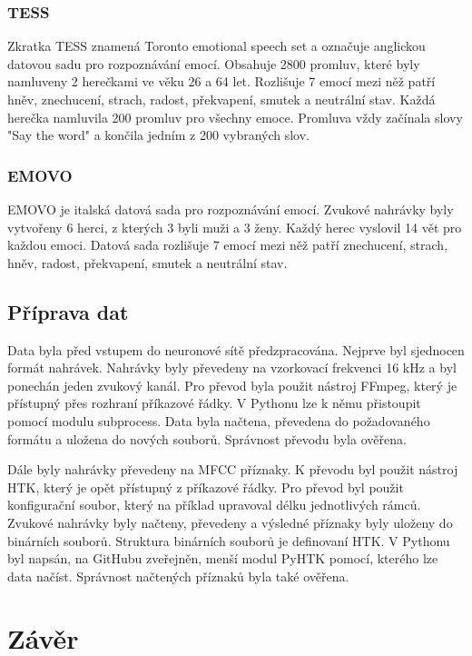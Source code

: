 \documentclass[FM,BP]{tulthesis}
\begin{document}
\subsection{TESS}
Zkratka TESS znamená Toronto emotional speech set a označuje anglickou datovou sadu pro rozpoznávání emocí. Obsahuje 2800 promluv, které byly namluveny 2 herečkami ve věku 26 a 64 let. Rozlišuje 7 emocí mezi něž patří hněv, znechucení, strach, radost, překvapení, smutek a neutrální stav. Každá herečka namluvila 200 promluv pro všechny emoce. Promluva vždy začínala slovy "Say the word" a končila jedním z 200 vybraných slov.\cite{tess}

\subsection{EMOVO}
EMOVO je italská datová sada pro rozpoznávání emocí. Zvukové nahrávky byly vytvořeny 6 herci, z kterých 3 byli muži a 3 ženy. Každý herec vyslovil 14 vět pro každou emoci. Datová sada rozlišuje 7 emocí mezi něž patří znechucení, strach, hněv, radost, překvapení, smutek a neutrální stav.\cite{COSTANTINI14.591}

\section{Příprava dat}
Data byla před vstupem do neuronové sítě předzpracována. Nejprve byl sjednocen formát nahrávek. Nahrávky byly převedeny na vzorkovací frekvenci 16 kHz a byl ponechán jeden zvukový kanál. Pro převod byla použit nástroj FFmpeg, který je přístupný přes rozhraní příkazové řádky. V Pythonu lze k němu přistoupit pomocí modulu subprocess. Data byla načtena, převedena do požadovaného formátu a uložena do nových souborů. Správnost převodu byla ověřena.

Dále byly nahrávky převedeny na MFCC příznaky. K převodu byl použit nástroj HTK, který je opět přístupný z příkazové řádky. Pro převod byl použit konfigurační soubor, který na příklad upravoval délku jednotlivých rámců. Zvukové nahrávky byly načteny, převedeny a výsledné příznaky byly uloženy do binárních souborů. Struktura binárních souborů je definovaní HTK. V Pythonu byl napsán, na GitHubu zveřejněn, menší modul PyHTK pomocí, kterého lze data načíst. Správnost načtených příznaků byla také ověřena.

\chapter{Závěr}

\nocite{*}
\printbibliography[title={Použitá literatura}] %
\end{document}
